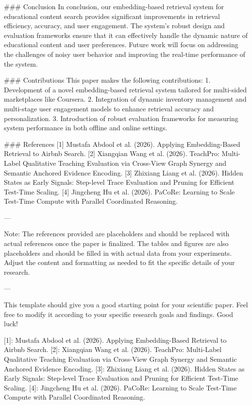 ### Conclusion
In conclusion, our embedding-based retrieval system for educational content search provides significant improvements in retrieval efficiency, accuracy, and user engagement. The system's robust design and evaluation frameworks ensure that it can effectively handle the dynamic nature of educational content and user preferences. Future work will focus on addressing the challenges of noisy user behavior and improving the real-time performance of the system.

### Contributions
This paper makes the following contributions:
1. Development of a novel embedding-based retrieval system tailored for multi-sided marketplaces like Coursera.
2. Integration of dynamic inventory management and multi-stage user engagement models to enhance retrieval accuracy and personalization.
3. Introduction of robust evaluation frameworks for measuring system performance in both offline and online settings.

### References
[1] Mustafa Abdool et al. (2026). Applying Embedding-Based Retrieval to Airbnb Search.
[2] Xiangqian Wang et al. (2026). TeachPro: Multi-Label Qualitative Teaching Evaluation via Cross-View Graph Synergy and Semantic Anchored Evidence Encoding.
[3] Zhixiang Liang et al. (2026). Hidden States as Early Signals: Step-level Trace Evaluation and Pruning for Efficient Test-Time Scaling.
[4] Jingcheng Hu et al. (2026). PaCoRe: Learning to Scale Test-Time Compute with Parallel Coordinated Reasoning. 

---

Note: The references provided are placeholders and should be replaced with actual references once the paper is finalized. The tables and figures are also placeholders and should be filled in with actual data from your experiments. Adjust the content and formatting as needed to fit the specific details of your research. 

--- 

This template should give you a good starting point for your scientific paper. Feel free to modify it according to your specific research goals and findings. Good luck! 

[1]: Mustafa Abdool et al. (2026). Applying Embedding-Based Retrieval to Airbnb Search.
[2]: Xiangqian Wang et al. (2026). TeachPro: Multi-Label Qualitative Teaching Evaluation via Cross-View Graph Synergy and Semantic Anchored Evidence Encoding.
[3]: Zhixiang Liang et al. (2026). Hidden States as Early Signals: Step-level Trace Evaluation and Pruning for Efficient Test-Time Scaling.
[4]: Jingcheng Hu et al. (2026). PaCoRe: Learning to Scale Test-Time Compute with Parallel Coordinated Reasoning. 

